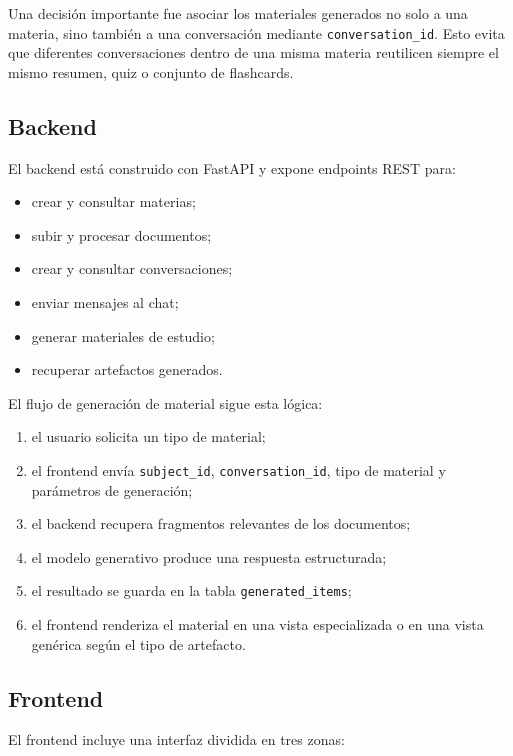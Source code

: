\documentclass[12pt, letterpaper]{article}
\begin{document}
	Una decisión importante fue asociar los materiales generados no solo a una materia, sino también a una conversación mediante \texttt{conversation\_id}. Esto evita que diferentes conversaciones dentro de una misma materia reutilicen siempre el mismo resumen, quiz o conjunto de flashcards.
	
	\subsection{Backend}
	
	El backend está construido con FastAPI y expone endpoints REST para:
	
	\begin{itemize}
		\item crear y consultar materias;
		\item subir y procesar documentos;
		\item crear y consultar conversaciones;
		\item enviar mensajes al chat;
		\item generar materiales de estudio;
		\item recuperar artefactos generados.
	\end{itemize}
	
	El flujo de generación de material sigue esta lógica:
	
	\begin{enumerate}
		\item el usuario solicita un tipo de material;
		\item el frontend envía \texttt{subject\_id}, \texttt{conversation\_id}, tipo de material y parámetros de generación;
		\item el backend recupera fragmentos relevantes de los documentos;
		\item el modelo generativo produce una respuesta estructurada;
		\item el resultado se guarda en la tabla \texttt{generated\_items};
		\item el frontend renderiza el material en una vista especializada o en una vista genérica según el tipo de artefacto.
	\end{enumerate}
	
	\subsection{Frontend}
	
	El frontend incluye una interfaz dividida en tres zonas:
	
\end{document}
